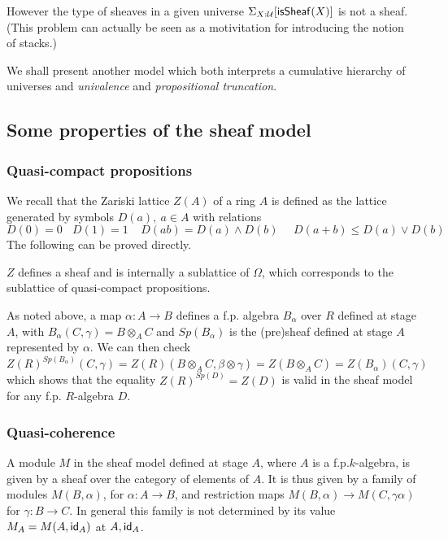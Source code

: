     \medskip

    However the type of sheaves in a given universe $\Sigma_{X:\mathcal{U}}[\mathsf{isSheaf}(X)]$ is not a sheaf. (This problem can actually be seen as a
    motivitation for introducing the notion of stacks.)

    We shall present another model which both interprets a cumulative hierarchy of universes
    and {\em univalence} and {\em propositional truncation}.

    \subsection{Some properties of the sheaf model}

    \subsubsection{Quasi-compact propositions}

    We recall \cite{lombardi-quitte}
    that the Zariski lattice $Z(A)$ of a ring $A$ is defined as the lattice generated by symbols $D(a),~a\in A$
    with relations
    $$
    D(0) = 0~~~~D(1) = 1~~~~~D(ab) = D(a)\wedge D(b)~~~~~~D(a+b)\leqslant D(a)\vee D(b)
    $$
    The following can be proved directly.

    \begin{proposition}
      $Z$ defines a sheaf and is internally a sublattice of $\Omega$, which corresponds to the sublattice of quasi-compact
      propositions.
    \end{proposition}
    
    As noted above, a map $\alpha:A\rightarrow B$ defines a f.p. algebra $B_{\alpha}$ over $R$ defined at stage $A$, with
    $B_{\alpha}(C,\gamma) = B\otimes_A C$ and $Sp(B_{\alpha})$ is
    the (pre)sheaf defined at stage $A$ represented by $\alpha$.
    We can then check
    $$Z(R)^{Sp(B_{\alpha})}(C,\gamma) = Z(R)(B\otimes_A C,\beta\otimes\gamma) = Z(B\otimes_A C) = Z(B_{\alpha})(C,\gamma)$$
    which shows that the equality $Z(R)^{Sp(D)} = Z(D)$ is valid in the sheaf model for any f.p. $R$-algebra $D$.

    \subsubsection{Quasi-coherence}

A module $M$ in the sheaf model defined at stage $A$, where $A$ is a f.p.\@ $k$-algebra, is given by a sheaf over the category
of elements of $A$. It is thus given by a family of modules $M(B,\alpha)$, for $\alpha:A\rightarrow B$, and restriction maps
$M(B,\alpha)\rightarrow M(C,\gamma\alpha)$ for $\gamma:B\rightarrow C$. In general this family is not determined by
its value $M_A = M(A,\mathsf{id}_A)$ at $A,\mathsf{id}_A$.

